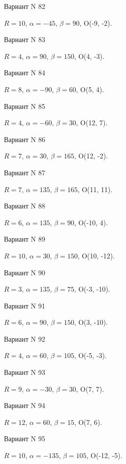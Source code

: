 \documentclass[11pt]{report}
\begin{document}
Вариант N 82

$R = 10$, $\alpha = -45$, $\beta = 90$, O(-9, -2).



Вариант N 83

$R = 4$, $\alpha = 90$, $\beta = 150$, O(4, -3).



Вариант N 84

$R = 8$, $\alpha = -90$, $\beta = 60$, O(5, 4).



Вариант N 85

$R = 4$, $\alpha = -60$, $\beta = 30$, O(12, 7).



Вариант N 86

$R = 7$, $\alpha = 30$, $\beta = 165$, O(12, -2).



Вариант N 87

$R = 7$, $\alpha = 135$, $\beta = 165$, O(11, 11).



Вариант N 88

$R = 6$, $\alpha = 135$, $\beta = 90$, O(-10, 4).



Вариант N 89

$R = 10$, $\alpha = 30$, $\beta = 150$, O(10, -12).



Вариант N 90

$R = 3$, $\alpha = 135$, $\beta = 75$, O(-3, -10).



Вариант N 91

$R = 6$, $\alpha = 90$, $\beta = 150$, O(3, -10).



Вариант N 92

$R = 4$, $\alpha = 60$, $\beta = 105$, O(-5, -3).



Вариант N 93

$R = 9$, $\alpha = -30$, $\beta = 30$, O(7, 7).



Вариант N 94

$R = 12$, $\alpha = 60$, $\beta = 15$, O(7, 6).



Вариант N 95

$R = 10$, $\alpha = -135$, $\beta = 105$, O(-12, -5).
\end{document}
